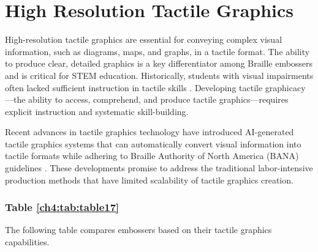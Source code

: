 \section{High Resolution Tactile Graphics}\label{ch4:sec:tactile-graphics}

High-resolution tactile graphics are essential for conveying complex visual information, such as diagrams, maps, and graphs, in a tactile format. The ability to produce clear, detailed graphics is a key differentiator among Braille embossers and is critical for STEM education.\supercite{NYUMaps, TouchMapper} Historically, students with visual impairments often lacked sufficient instruction in tactile skills \supercite{TactileSkillsDevelopment}. Developing tactile graphicacy—the ability to access, comprehend, and produce tactile graphics—requires explicit instruction and systematic skill-building.

Recent advances in tactile graphics technology have introduced AI-generated tactile graphics systems that can automatically convert visual information into tactile formats while adhering to Braille Authority of North America (BANA) guidelines \supercite{BrailleMathCodes, BANA}. These developments promise to address the traditional labor-intensive production methods that have limited scalability of tactile graphics creation.\supercite{ASUImageGen, BlindSVG}

\subsubsection{Table \ref{ch4:tab:table17}}
The following table compares embossers based on their tactile graphics capabilities.

